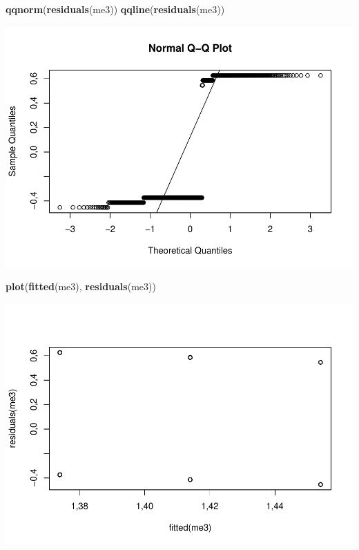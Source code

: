 \documentclass[]{article}
\newenvironment{Shaded}{\begin{snugshade}}{\end{snugshade}}
\newcommand{\KeywordTok}[1]{\textcolor[rgb]{0.13,0.29,0.53}{\textbf{#1}}}
\newcommand{\NormalTok}[1]{#1}
\begin{document}
\begin{Shaded}
\begin{Highlighting}[]
\KeywordTok{qqnorm}\NormalTok{(}\KeywordTok{residuals}\NormalTok{(me3))}
\KeywordTok{qqline}\NormalTok{(}\KeywordTok{residuals}\NormalTok{(me3))}
\end{Highlighting}
\end{Shaded}

\includegraphics{titanicDataClean_files/figure-latex/unnamed-chunk-25-5.pdf}

\begin{Shaded}
\begin{Highlighting}[]
\KeywordTok{plot}\NormalTok{(}\KeywordTok{fitted}\NormalTok{(me3), }\KeywordTok{residuals}\NormalTok{(me3))}
\end{Highlighting}
\end{Shaded}

\includegraphics{titanicDataClean_files/figure-latex/unnamed-chunk-25-6.pdf}
\end{document}
